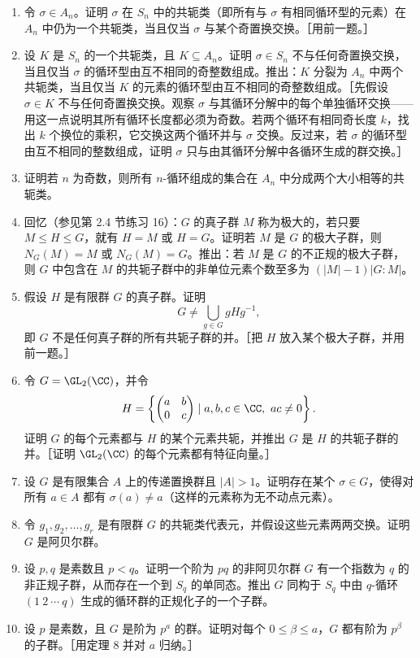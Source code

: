 \begin{enumerate}[label=\arabic*.]
  \item 令 $\sigma\in A_n$。证明 $\sigma$ 在 $S_n$ 中的共轭类（即所有与 $\sigma$ 有相同循环型的元素）在 $A_n$ 中仍为一个共轭类，当且仅当 $\sigma$ 与某个奇置换交换。［用前一题。］
  \item 设 $K$ 是 $S_n$ 的一个共轭类，且 $K\subseteq A_n$。证明 $\sigma\in S_n$ 不与任何奇置换交换，当且仅当 $\sigma$ 的循环型由互不相同的奇整数组成。推出：$K$ 分裂为 $A_n$ 中两个共轭类，当且仅当 $K$ 的元素的循环型由互不相同的奇整数组成。［先假设 $\sigma\in K$ 不与任何奇置换交换。观察 $\sigma$ 与其循环分解中的每个单独循环交换——用这一点说明其所有循环长度都必须为奇数。若两个循环有相同奇长度 $k$，找出 $k$ 个换位的乘积，它交换这两个循环并与 $\sigma$ 交换。反过来，若 $\sigma$ 的循环型由互不相同的整数组成，证明 $\sigma$ 只与由其循环分解中各循环生成的群交换。］
  \item 证明若 $n$ 为奇数，则所有 $n$-循环组成的集合在 $A_n$ 中分成两个大小相等的共轭类。
  \item 回忆（参见第 2.4 节练习 16）：$G$ 的真子群 $M$ 称为极大的，若只要 $M\leq H\leq G$，就有 $H=M$ 或 $H=G$。证明若 $M$ 是 $G$ 的极大子群，则 $N_G(M)=M$ 或 $N_G(M)=G$。推出：若 $M$ 是 $G$ 的不正规的极大子群，则 $G$ 中包含在 $M$ 的共轭子群中的非单位元素个数至多为 $(|M|-1)|G:M|$。
  \item 假设 $H$ 是有限群 $G$ 的真子群。证明
  \[
    G\neq\bigcup_{g\in G}gHg^{-1},
  \]
  即 $G$ 不是任何真子群的所有共轭子群的并。［把 $H$ 放入某个极大子群，并用前一题。］
  \item 令 $G=\GL_2(\CC)$，并令
  \[
    H=\left\{\begin{pmatrix}a&b\\0&c\end{pmatrix}\mid a,b,c\in\CC,\ ac\neq0\right\}.
  \]
  证明 $G$ 的每个元素都与 $H$ 的某个元素共轭，并推出 $G$ 是 $H$ 的共轭子群的并。［证明 $\GL_2(\CC)$ 的每个元素都有特征向量。］
  \item 设 $G$ 是有限集合 $A$ 上的传递置换群且 $|A|>1$。证明存在某个 $\sigma\in G$，使得对所有 $a\in A$ 都有 $\sigma(a)\neq a$（这样的元素称为无不动点元素）。
  \item 令 $g_1,g_2,\ldots,g_r$ 是有限群 $G$ 的共轭类代表元，并假设这些元素两两交换。证明 $G$ 是阿贝尔群。
  \item 设 $p,q$ 是素数且 $p<q$。证明一个阶为 $pq$ 的非阿贝尔群 $G$ 有一个指数为 $q$ 的非正规子群，从而存在一个到 $S_q$ 的单同态。推出 $G$ 同构于 $S_q$ 中由 $q$-循环 $(1\ 2\ \cdots\ q)$ 生成的循环群的正规化子的一个子群。
  \item 设 $p$ 是素数，且 $G$ 是阶为 $p^a$ 的群。证明对每个 $0\leq \beta\leq a$，$G$ 都有阶为 $p^\beta$ 的子群。［用定理 8 并对 $a$ 归纳。］

\end{enumerate}
